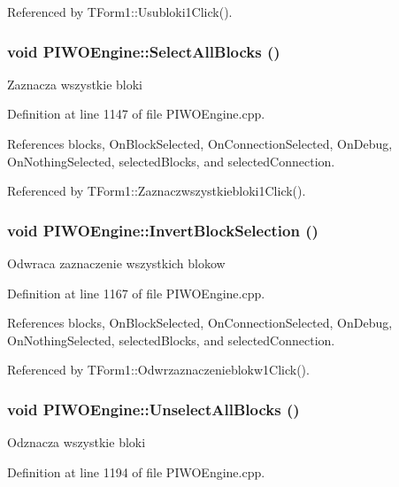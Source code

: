 Referenced by TForm1::Usubloki1Click().\hypertarget{classPIWOEngine_27e53e5d565cca55d8663a14906ab720}{
\subsubsection[SelectAllBlocks]{\setlength{\rightskip}{0pt plus 5cm}void PIWOEngine::SelectAllBlocks ()}}
\label{classPIWOEngine_27e53e5d565cca55d8663a14906ab720}


Zaznacza wszystkie bloki 

Definition at line 1147 of file PIWOEngine.cpp.

References blocks, OnBlockSelected, OnConnectionSelected, OnDebug, OnNothingSelected, selectedBlocks, and selectedConnection.

Referenced by TForm1::Zaznaczwszystkiebloki1Click().\hypertarget{classPIWOEngine_b8926ec72c402ff687ac16061c9d35eb}{
\subsubsection[InvertBlockSelection]{\setlength{\rightskip}{0pt plus 5cm}void PIWOEngine::InvertBlockSelection ()}}
\label{classPIWOEngine_b8926ec72c402ff687ac16061c9d35eb}


Odwraca zaznaczenie wszystkich blokow 

Definition at line 1167 of file PIWOEngine.cpp.

References blocks, OnBlockSelected, OnConnectionSelected, OnDebug, OnNothingSelected, selectedBlocks, and selectedConnection.

Referenced by TForm1::Odwrzaznaczenieblokw1Click().\hypertarget{classPIWOEngine_60d90f58e1d47c5a12547126700799c7}{
\subsubsection[UnselectAllBlocks]{\setlength{\rightskip}{0pt plus 5cm}void PIWOEngine::UnselectAllBlocks ()}}
\label{classPIWOEngine_60d90f58e1d47c5a12547126700799c7}


Odznacza wszystkie bloki 

Definition at line 1194 of file PIWOEngine.cpp.

